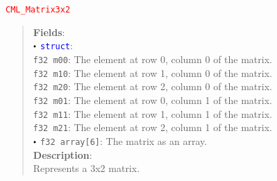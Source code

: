 \documentclass[a4paper,oneside,8pt]{extarticle}
\newcommand{\union}[1]{
  \noindent\textcolor{red}{\texttt{#1}}
  \vspace{-0.3em}
}
\renewcommand{\dot}{\raisebox{0.3ex}{\scalebox{0.6}{$\bullet$}}}
\theoremstyle{definition}
\begin{document}
\union{CML\_Matrix3x2}
\begin{quote}
  \textbf{Fields}: \\
  $\dot$ \textcolor{blue}{\texttt{struct}}: \\
  \indent\hspace{1em} \texttt{f32 m00}: The element at row 0, column 0 of the matrix. \\
  \indent\hspace{1em} \texttt{f32 m10}: The element at row 1, column 0 of the matrix. \\
  \indent\hspace{1em} \texttt{f32 m20}: The element at row 2, column 0 of the matrix. \\
  \indent\hspace{1em} \texttt{f32 m01}: The element at row 0, column 1 of the matrix. \\
  \indent\hspace{1em} \texttt{f32 m11}: The element at row 1, column 1 of the matrix. \\
  \indent\hspace{1em} \texttt{f32 m21}: The element at row 2, column 1 of the matrix. \\
  $\dot$ \texttt{f32 array[6]}: The matrix as an array. \\

  \vspace{-0.75em}
  \textbf{Description}: \\
  Represents a 3x2 matrix. \\
\end{quote}
\end{document}
